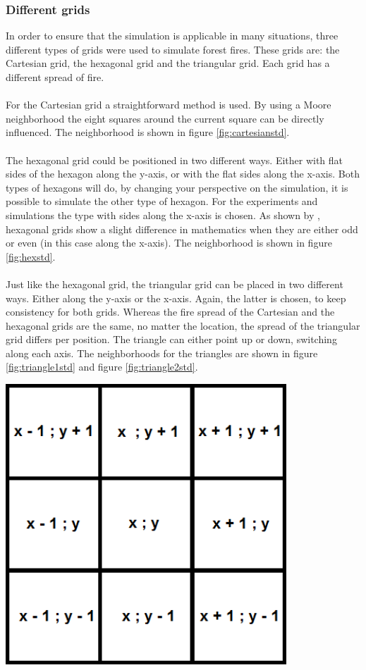 \documentclass{article}
\newenvironment{Figure}
  {\par\medskip\noindent\minipage{\linewidth}}
  {\endminipage\par\medskip}
\begin{document}
\begin{multicols}{2}
\subsubsection*{Different grids}
In order to ensure that the simulation is applicable in many situations, three different types of grids were used to simulate forest fires. These grids are: the Cartesian grid, the hexagonal grid and the triangular grid. Each grid has a different spread of fire.\\\\
For the Cartesian grid a straightforward method is used. By using a Moore neighborhood the eight squares around the current square can be directly influenced. The neighborhood is shown in figure \ref{fig:cartesianstd}.\\\\
The hexagonal grid could be positioned in two different ways. Either with flat sides of the hexagon along the y-axis, or with the flat sides along the x-axis. Both types of hexagons will do, by changing your perspective on the simulation, it is possible to simulate the other type of hexagon. For the experiments and simulations the type with sides along the x-axis is chosen. As shown by \cite{HernandezEncinas20071213}, hexagonal grids show a slight difference in mathematics when they are either odd or even (in this case along the x-axis). The neighborhood is shown in figure \ref{fig:hexstd}.  \\\\
Just like the hexagonal grid, the triangular grid can be placed in two different ways. Either along the y-axis or the x-axis. Again, the latter is chosen, to keep consistency for both grids. Whereas the fire spread of the Cartesian and the hexagonal grids are the same, no matter the location, the spread of the triangular grid differs per position. The triangle can either point up or down, switching along each axis. The neighborhoods for the triangles are shown in figure \ref{fig:triangle1std} and figure \ref{fig:triangle2std}.
\begin{Figure}
 \centering
 \includegraphics[width=0.79\textwidth]{imgs/cartesian.png}

\end{Figure}
\end{multicols}
\end{document}

